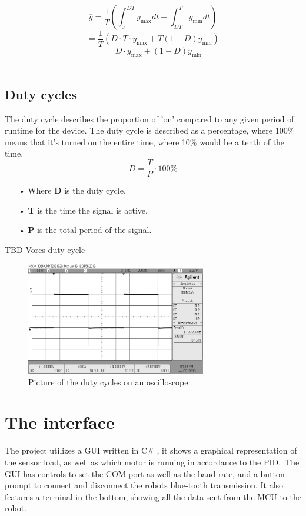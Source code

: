  $$\overline{y}=\frac{1}{T}\left(\int_{0}^{DT}y_\mathrm{max}dt+\int_{DT}^{T}y_\mathrm{min}dt\right)$$
 $$=\frac{1}{T}\left(D \cdot T \cdot y_\mathrm{max}+T(1-D)y_\mathrm{min}\right)$$
 $$=D \cdot y_\mathrm{max}+\left(1-D\right)y_\mathrm{min}$$\
  
\newpage
\subsection{Duty cycles}
The duty cycle describes the proportion of 'on' compared to any given period of runtime for the device. The duty cycle is described as a percentage, where 100\% means that it's turned on the entire time, where 10\% would be a tenth of the time.\\
$${D}=\frac{T}{P} \cdot 100\%$$ 

\begin{enumerate}
\item[•]Where {\textbf{D}} is the duty cycle. 
\item[•]{\textbf{T}} is the time the signal is active.
\item[•]{\textbf{P}} is the total period of the signal.
\end{enumerate}
TBD Vores duty cycle


\begin{figure}[h!]
  \centering
  \includegraphics[width=0.7\textwidth]{figures/f1000d50.png}  
\caption{Picture of the duty cycles on an oscilloscope.}  
  \label{Duty cycles}
\end{figure}
\newpage

\section{The interface}
The project utilizes a GUI written in C\# , it shows a graphical representation of the sensor load, as well as which motor is running in accordance to the PID.\
The GUI has controls to set the COM-port as well as the baud rate, and a button prompt to connect and disconnect the robots blue-tooth transmission. It also features a terminal in the bottom, showing all the data sent from the MCU to the robot.

